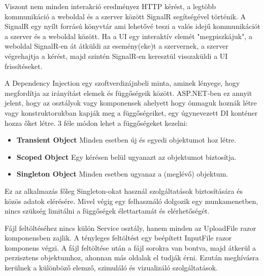 Viszont nem minden interakció eredményez HTTP kérést, a legtöbb kommunikáció a weboldal és a szerver között SignalR segítségével történik. A SignalR egy nyílt forrású könyvtár ami lehetővé teszi a valós idejű kommunikációt a szerver és a weboldal között. Ha a UI egy interaktív elemét "megpiszkájuk", a weboldal SignalR-en át átküldi az esemény(eke)t a szervernek, a szerver végrehajtja a kérést, majd szintén SignalR-en keresztül visszaküldi a UI frissítéseket.

A Dependency Injection egy szoftverdizájnbeli minta, aminek lényege, hogy megfordítja az irányítást elemek és függőségeik között. ASP.NET-ben ez annyit jelent, hogy az osztályok vagy komponensek ahelyett hogy önmaguk hoznák létre vagy konstruktorukban kapják meg a függőségeiket, egy úgynevezett DI konténer hozza őket létre. 3 féle módon lehet a függőségeket kezelni:
\begin{itemize}
\item\textbf{Transient Object} Minden esetben új és egyedi objektumot hoz létre.
\item\textbf{Scoped Object} Egy kérésen belül ugyanazt az objektumot biztosítja.
\item\textbf{Singleton Object} Minden esetben ugyanaz a (meglévő) objektum.
\end{itemize}
Ez az alkalmazás főleg Singleton-okat használ szolgáltatások biztosítására és közös adatok elérésére. Mivel végig egy felhasználó dolgozik egy munkamenetben, nincs szükség limitálni a függőségek élettartamát és elérhetőségét.

Fájl feltöltéséhez nincs külön Service osztály, hanem minden az UploadFile razor komponensben zajlik. A tényleges feltöltést egy beépített InputFile razor komponens végzi. A fájl feltöltése után a fájl sorokra van bontva, majd átkerül a perzisztens objektumhoz, ahonnan más oldalak el tudják érni. Ezután meghívásra kerülnek a különböző elemző, szimuláló és vizualizáló szolgáltatások.


